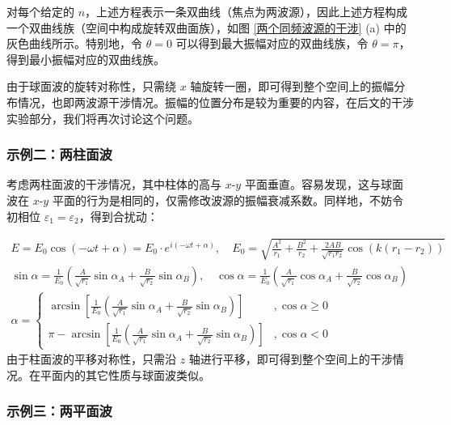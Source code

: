 \documentclass[UTF8]{report}
\theoremstyle{MyLineTheoremStyle} %
\theoremstyle{MyBlockTheoremStyle} %
\theoremstyle{MySubsubsectionStyle} %
\begin{document}
对每个给定的 $n$，上述方程表示一条双曲线（焦点为两波源），因此上述方程构成一个双曲线族（空间中构成旋转双曲面族），如图 \ref{两个同频波源的干涉} (a) 中的灰色曲线所示。特别地，令 $\theta = 0$ 可以得到最大振幅对应的双曲线族，令 $\theta = \pi$，得到最小振幅对应的双曲线族。

由于球面波的旋转对称性，只需绕 $x$ 轴旋转一圈，即可得到整个空间上的振幅分布情况，也即两波源干涉情况。振幅的位置分布是较为重要的内容，在后文的干涉实验部分，我们将再次讨论这个问题。


\subsubsection{示例二：两柱面波}

考虑两柱面波的干涉情况，其中柱体的高与 $x$-$y$ 平面垂直。容易发现，这与球面波在 $x$-$y$ 平面的行为是相同的，仅需修改波源的振幅衰减系数。同样地，不妨令初相位 $\varepsilon_1 = \varepsilon_2$，得到合扰动：

\begin{gather}
    E = E_0 \cos \left(-\omega t + \alpha \right) = E_0 \cdot e^{i(-\omega t + \alpha)},\quad E_0 = \sqrt{\frac{A^2}{r_1} + \frac{B^2}{r_2} + \frac{2AB}{\sqrt{r_1r_2} }\cos\left( k \left( r_1  - r_2 \right)\right)} \\ 
    \sin \alpha = \frac{1}{E_0} \left( \frac{A}{ \sqrt{r_1} }\sin \alpha_A + \frac{B}{ \sqrt{r_2} } \sin \alpha_B\right),\quad \cos \alpha = \frac{1}{E_0} \left( \frac{A}{ \sqrt{r_1} }\cos \alpha_A + \frac{B}{ \sqrt{r_2} } \cos \alpha_B\right)\\ 
    \alpha = 
    \begin{cases}
        \arcsin \left[ \frac{1}{E_0} \left( \frac{A}{ \sqrt{r_1} }\sin \alpha_A + \frac{B}{ \sqrt{r_2} } \sin \alpha_B\right) \right] &, \cos \alpha \geqslant 0 \\
        \pi - \arcsin \left[ \frac{1}{E_0} \left( \frac{A}{ \sqrt{r_1} }\sin \alpha_A + \frac{B}{ \sqrt{r_2} } \sin \alpha_B\right) \right] &,  \cos \alpha < 0
    \end{cases}
\end{gather}
由于柱面波的平移对称性，只需沿 $z$ 轴进行平移，即可得到整个空间上的干涉情况。在平面内的其它性质与球面波类似。

\subsubsection{示例三：两平面波}
\end{document}
